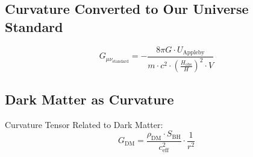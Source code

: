 \documentclass[a4paper, 11pt]{article}
\begin{document}
\subsection{Curvature Converted to Our Universe Standard}
\begin{equation}
G_{\mu\nu_{\text{standard}}} = -\frac{8 \pi G \cdot U_{\text{Appleby}}}{m \cdot c^2 \cdot \left(\frac{H_{\text{obs}}}{H}\right)^2 \cdot V}
\end{equation}

\subsection{Dark Matter as Curvature}

Curvature Tensor Related to Dark Matter:
\begin{equation}
G_{\text{DM}} = \frac{\rho_{\text{DM}} \cdot S_{\text{BH}}}{c_{\text{eff}}^2} \cdot \frac{1}{r^2}
\end{equation}
\end{document}
